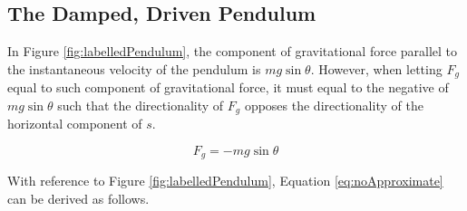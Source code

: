 \documentclass[letterpaper, 12pt]{article}
\begin{document}
\subsection{The Damped, Driven Pendulum}

In Figure \ref*{fig:labelledPendulum}, the component of
gravitational force parallel to the instantaneous velocity of
the pendulum is \(mg\sin\theta\). However, when letting
\(F_g\) equal to such component of gravitational force,
it must equal to the negative of \(mg\sin\theta\)
such that the directionality of \(F_g\) opposes
the directionality of the horizontal component
of \(s\).

\begin{equation}
    F_g = -mg\sin\theta
\end{equation}


With reference to Figure \ref*{fig:labelledPendulum}, Equation \ref*{eq:noApproximate}
can be derived as follows.
\end{document}
